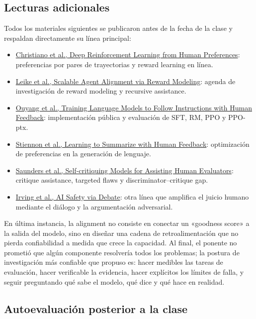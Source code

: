 \documentclass[a4paper]{article}
\begin{document}
\subsection{Lecturas adicionales}

Todos los materiales siguientes se publicaron antes de la fecha de la clase y respaldan directamente su línea principal:

\begin{itemize}
  \item \href{https://arxiv.org/abs/1706.03741}{Christiano et al., Deep Reinforcement Learning from Human Preferences}: preferencias por pares de trayectorias y reward learning en línea.
  \item \href{https://arxiv.org/abs/1811.07871}{Leike et al., Scalable Agent Alignment via Reward Modeling}: agenda de investigación de reward modeling y recursive assistance.
  \item \href{https://arxiv.org/abs/2203.02155}{Ouyang et al., Training Language Models to Follow Instructions with Human Feedback}: implementación pública y evaluación de SFT, RM, PPO y PPO-ptx.
  \item \href{https://arxiv.org/abs/2009.01325}{Stiennon et al., Learning to Summarize with Human Feedback}: optimización de preferencias en la generación de lenguaje.
  \item \href{https://arxiv.org/abs/2206.05802}{Saunders et al., Self-critiquing Models for Assisting Human Evaluators}: critique assistance, targeted flaws y discriminator--critique gap.
  \item \href{https://arxiv.org/abs/1805.00899}{Irving et al., AI Safety via Debate}: otra línea que amplifica el juicio humano mediante el diálogo y la argumentación adversarial.
\end{itemize}

En última instancia, la alignment no consiste en conectar un «goodness score» a la salida del modelo, sino en diseñar una cadena de retroalimentación que no pierda confiabilidad a medida que crece la capacidad. Al final, el ponente no prometió que algún componente resolvería todos los problemas; la postura de investigación más confiable que propuso es: hacer medibles las tareas de evaluación, hacer verificable la evidencia, hacer explícitos los límites de falla, y seguir preguntando qué sabe el modelo, qué dice y qué hace en realidad.

\subsection{Autoevaluación posterior a la clase}
\end{document}
